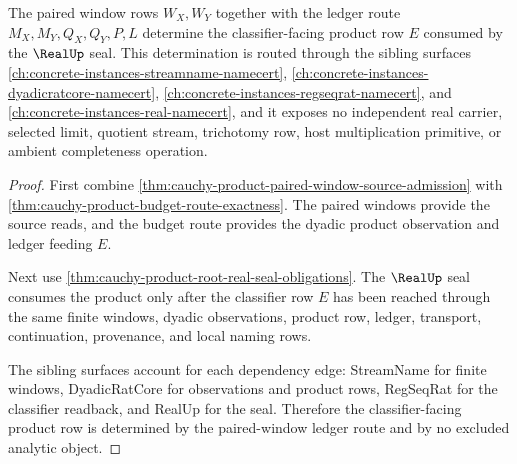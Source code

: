 \begin{theorem}
\label{thm:cauchy-product-paired-window-ledger-classifier}
The paired window rows $W_X,W_Y$ together with the ledger route $M_X,M_Y,Q_X,Q_Y,P,L$ determine the classifier-facing product row $E$ consumed by the $\RealUp$ seal. This determination is routed through the sibling surfaces \autoref{ch:concrete-instances-streamname-namecert}, \autoref{ch:concrete-instances-dyadicratcore-namecert}, \autoref{ch:concrete-instances-regseqrat-namecert}, and \autoref{ch:concrete-instances-real-namecert}, and it exposes no independent real carrier, selected limit, quotient stream, trichotomy row, host multiplication primitive, or ambient completeness operation.
\end{theorem}
\begin{proof}
First combine \autoref{thm:cauchy-product-paired-window-source-admission} with \autoref{thm:cauchy-product-budget-route-exactness}. The paired windows provide the source reads, and the budget route provides the dyadic product observation and ledger feeding $E$.

Next use \autoref{thm:cauchy-product-root-real-seal-obligations}. The $\RealUp$ seal consumes the product only after the classifier row $E$ has been reached through the same finite windows, dyadic observations, product row, ledger, transport, continuation, provenance, and local naming rows.

The sibling surfaces account for each dependency edge: StreamName for finite windows, DyadicRatCore for observations and product rows, RegSeqRat for the classifier readback, and RealUp for the seal. Therefore the classifier-facing product row is determined by the paired-window ledger route and by no excluded analytic object.
\end{proof}

